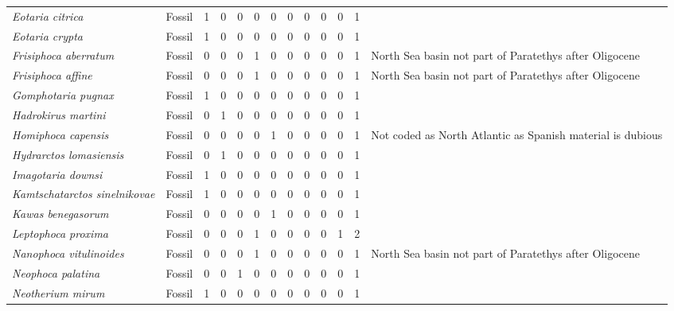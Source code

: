 \begin{longtable}{llccccccccccp{}}
\textit{Eotaria citrica} &
Fossil &
1 &
0 &
0 &
0 &
0 &
0 &
0 &
0 &
0 &
1 &
\\

\textit{Eotaria crypta} &
Fossil &
1 &
0 &
0 &
0 &
0 &
0 &
0 &
0 &
0 &
1 &
\\

\textit{Frisiphoca aberratum} &
Fossil &
0 &
0 &
0 &
1 &
0 &
0 &
0 &
0 &
0 &
1 &
North Sea basin not part of Paratethys after Oligocene\\

\textit{Frisiphoca affine} &
Fossil &
0 &
0 &
0 &
1 &
0 &
0 &
0 &
0 &
0 &
1 &
North Sea basin not part of Paratethys after Oligocene\\

\textit{Gomphotaria pugnax} &
Fossil &
1 &
0 &
0 &
0 &
0 &
0 &
0 &
0 &
0 &
1 &
\\

\textit{Hadrokirus martini} &
Fossil &
0 &
1 &
0 &
0 &
0 &
0 &
0 &
0 &
0 &
1 &
\\

\textit{Homiphoca capensis} &
Fossil &
0 &
0 &
0 &
0 &
1 &
0 &
0 &
0 &
0 &
1 &
Not coded as North Atlantic as Spanish material is dubious\\

\textit{Hydrarctos lomasiensis} &
Fossil &
0 &
1 &
0 &
0 &
0 &
0 &
0 &
0 &
0 &
1 &
\\

\textit{Imagotaria downsi} &
Fossil &
1 &
0 &
0 &
0 &
0 &
0 &
0 &
0 &
0 &
1 &
\\

\textit{Kamtschatarctos sinelnikovae} &
Fossil &
1 &
0 &
0 &
0 &
0 &
0 &
0 &
0 &
0 &
1 &
\\

\textit{Kawas benegasorum} &
Fossil &
0 &
0 &
0 &
0 &
1 &
0 &
0 &
0 &
0 &
1 &
\\

\textit{Leptophoca proxima} &
Fossil &
0 &
0 &
0 &
1 &
0 &
0 &
0 &
0 &
1 &
2 &
\\

\textit{Nanophoca vitulinoides} &
Fossil &
0 &
0 &
0 &
1 &
0 &
0 &
0 &
0 &
0 &
1 &
North Sea basin not part of Paratethys after Oligocene\\

\textit{Neophoca palatina} &
Fossil &
0 &
0 &
1 &
0 &
0 &
0 &
0 &
0 &
0 &
1 &
\\

\textit{Neotherium mirum} &
Fossil &
1 &
0 &
0 &
0 &
0 &
0 &
0 &
0 &
0 &
1 &
\\


\end{longtable}
